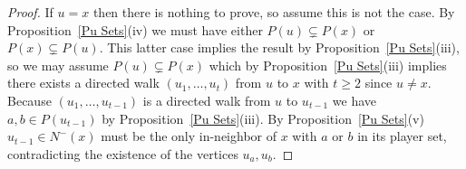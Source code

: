 \documentclass[12pt,letterpaper]{article}
\theoremstyle{definition}
\renewcommand{\1}{\mathbbm{1}}
\begin{document}
\begin{proof}
	If $u=x$ then there is nothing to prove, so assume this is not the case.  By Proposition~\ref{Pu Sets}(iv) we must have either $P(u)\subsetneq P(x)$ or $P(x)\subsetneq P(u)$.  This latter case implies the result by Proposition~\ref{Pu Sets}(iii), so we may assume  $P(u)\subsetneq P(x)$ which by Proposition~\ref{Pu Sets}(iii) implies there exists a directed walk $(u_1,\ldots,u_t)$ from $u$ to $x$ with $t\ge 2$ since $u\ne x$.  Because $(u_1,\ldots,u_{t-1})$ is a directed walk from $u$ to $u_{t-1}$ we have $a,b\in P(u_{t-1})$ by Proposition~\ref{Pu Sets}(iii). By Proposition~\ref{Pu Sets}(v) $u_{t-1}\in N^-(x)$ must be the only in-neighbor of $x$ with $a$ or $b$ in its player set, contradicting the existence of the vertices $u_a,u_b$.
\end{proof}
\end{document}
